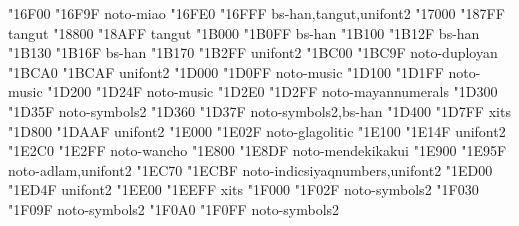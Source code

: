 \documentclass{article}
\begin{document}
                                           { "16F00} { "16F9F} {noto-miao}
            { "16FE0} { "16FFF} {bs-han,tangut,unifont2}
                                         { "17000} { "187FF} {tangut}
                              { "18800} { "18AFF} {tangut}
                                { "1B000} { "1B0FF} {bs-han}
                                { "1B100} { "1B12F} {bs-han}
                           { "1B130} { "1B16F} {bs-han}
                                          { "1B170} { "1B2FF} {unifont2}
                                       { "1BC00} { "1BC9F} {noto-duployan}
                      { "1BCA0} { "1BCAF} {unifont2}
                      { "1D000} { "1D0FF} {noto-music}
                                { "1D100} { "1D1FF} {noto-music}
                 { "1D200} { "1D24F} {noto-music}
                                 { "1D2E0} { "1D2FF} {noto-mayannumerals}
                          { "1D300} { "1D35F} {noto-symbols2}
                          { "1D360} { "1D37F} {noto-symbols2,bs-han}
              { "1D400} { "1D7FF} {xits}
                             { "1D800} { "1DAAF} {unifont2}
                          { "1E000} { "1E02F} {noto-glagolitic}
                         { "1E100} { "1E14F} {unifont2}
                                         { "1E2C0} { "1E2FF} {noto-wancho}
                                  { "1E800} { "1E8DF} {noto-mendekikakui}
                                          { "1E900} { "1E95F} {noto-adlam,unifont2}
                            { "1EC70} { "1ECBF} {noto-indicsiyaqnumbers,unifont2}
                          { "1ED00} { "1ED4F} {unifont2}
         { "1EE00} { "1EEFF} {xits}
                                  { "1F000} { "1F02F} {noto-symbols2}
                                   { "1F030} { "1F09F} {noto-symbols2}
                                  { "1F0A0} { "1F0FF} {noto-symbols2}
\end{document}
